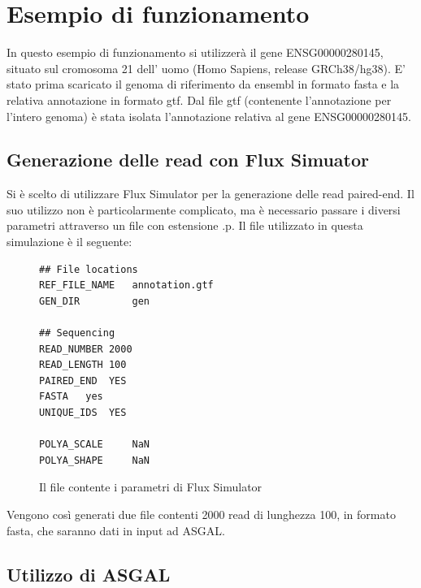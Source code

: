 \section{Esempio di funzionamento}

In questo esempio di funzionamento si utilizzerà il gene ENSG00000280145, situato sul cromosoma 21 dell' uomo (Homo Sapiens, release GRCh38/hg38). E' stato prima scaricato il genoma di riferimento da ensembl in formato fasta e la relativa annotazione in formato gtf. Dal file gtf (contenente l'annotazione per l'intero genoma) è stata isolata l'annotazione relativa al gene ENSG00000280145.

\subsection{Generazione delle read con Flux Simuator}

Si è scelto di utilizzare Flux Simulator per la generazione delle read paired-end. Il suo utilizzo non è particolarmente complicato, ma è necessario passare i diversi parametri attraverso un file con estensione .p. Il file utilizzato in questa simulazione è il seguente:

\begin{figure}[thp]
\begin{CenteredBox}
  \begin{lstlisting}
## File locations
REF_FILE_NAME   annotation.gtf
GEN_DIR         gen

## Sequencing
READ_NUMBER 2000
READ_LENGTH 100
PAIRED_END  YES
FASTA   yes
UNIQUE_IDS  YES

POLYA_SCALE     NaN
POLYA_SHAPE     NaN
  \end{lstlisting}
\end{CenteredBox}
\caption{Il file contente i parametri di Flux Simulator}
\end{figure}


Vengono così generati due file contenti 2000 read di lunghezza 100, in formato fasta, che saranno dati in input ad ASGAL.

\newpage

\subsection{Utilizzo di ASGAL}

